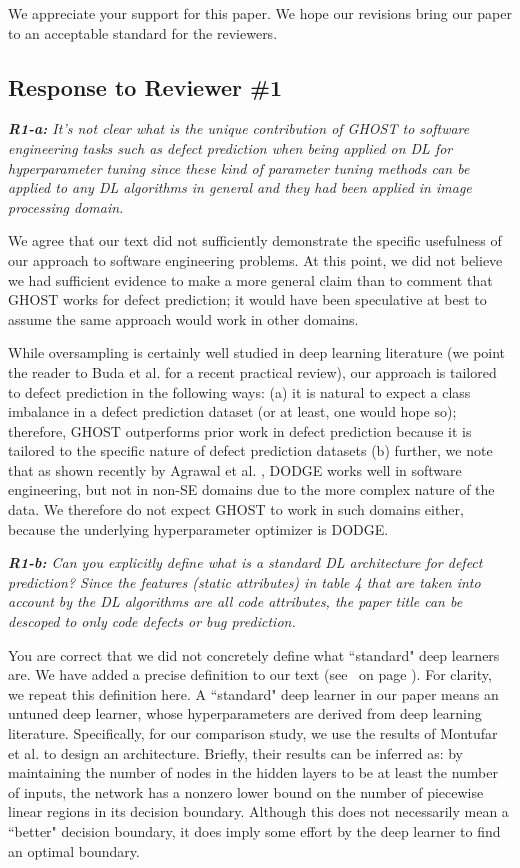 \documentclass[10pt,compsoc,twocolumn]{IEEEtran}
\newcommand{\respto}[1]{
\fcolorbox{black}{black!15}{%
\label{resp:#1}%
\bf\scriptsize R{#1}}}
\newcommand{\BLUE}{\color{blue}}
\newcommand{\BLACK}{\color{black}}
\newcommand{\citeresp}[1]{%
{(see }\fcolorbox{black}{black!15}{%
\bf\scriptsize R{#1}}~{{on page \pageref{resp:#1})}}}%
\begin{document}
\BLUE
We appreciate your support for this paper. We hope our revisions bring our paper to an acceptable standard for the reviewers.
\BLACK

\subsection*{Response to Reviewer \#1}

{\em {\bf R1-a:} It’s not clear what is the unique contribution of GHOST to software engineering tasks such as defect prediction when being applied on DL for hyperparameter tuning since these kind of parameter tuning methods can be applied to any DL algorithms in general and they had been applied in image processing domain.}

\respto{1a1}
\BLUE
 We agree that our text did not sufficiently demonstrate the specific usefulness of our approach to software engineering problems. At this point, we did not believe we had sufficient evidence to make a more general claim than to comment that GHOST works for defect prediction; it would have been speculative at best to assume the same approach would work in other domains.

While oversampling is certainly well studied in deep learning literature (we point the reader to Buda et al. \cite{buda2018systematic} for a recent practical review), our approach is tailored to defect prediction in the following ways: (a) it is natural to expect a class imbalance in a defect prediction dataset (or at least, one would hope so); therefore, GHOST outperforms prior work in defect prediction because it is tailored to the specific nature of defect prediction datasets (b) further, we note that as shown recently by Agrawal et al. \cite{agrawal2020simpler}, DODGE works well in software engineering, but not in non-SE domains due to the more complex nature of the data. We therefore do not expect GHOST to work in such domains either, because the underlying hyperparameter optimizer is DODGE.
\BLACK

{\em {\bf R1-b:} Can you explicitly define what is a standard DL architecture for defect prediction?
Since the features (static attributes) in table 4 that are taken into account by the DL algorithms are all code attributes, the paper title can be descoped to only code defects or bug prediction.}

\respto{1a2}
\BLUE
You are correct that we did not concretely define what ``standard" deep learners are. We have added a precise definition to our text \citeresp{1a2.1}. For clarity, we repeat this definition here. A ``standard" deep learner in our paper means an untuned deep learner, whose hyperparameters are derived from deep learning literature. Specifically, for our comparison study, we use the results of Montufar et al. \cite{montufar2014number} to design an architecture. Briefly, their results can be inferred as: by maintaining the number of nodes in the hidden layers to be at least the number of inputs, the network has a nonzero lower bound on the number of piecewise linear regions in its decision boundary. Although this does not necessarily mean a ``better" decision boundary, it does imply some effort by the deep learner to find an optimal boundary.
\end{document}
